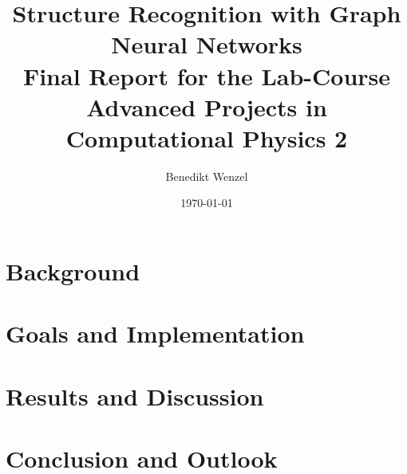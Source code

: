 \documentclass[12pt]{article}
\title{Structure Recognition with Graph Neural Networks \\[1em] \large Final Report for the Lab-Course Advanced Projects in Computational Physics 2}
\author{Benedikt Wenzel}
\date{\today}
\begin{document}
\maketitle

\begin{abstract}

\end{abstract}

\tableofcontents
\newpage

\section{Background}


\newpage
\section{Goals and Implementation}


\newpage
\section{Results and Discussion}


\newpage
\section{Conclusion and Outlook}


\newpage
\printbibliography
\end{document}
